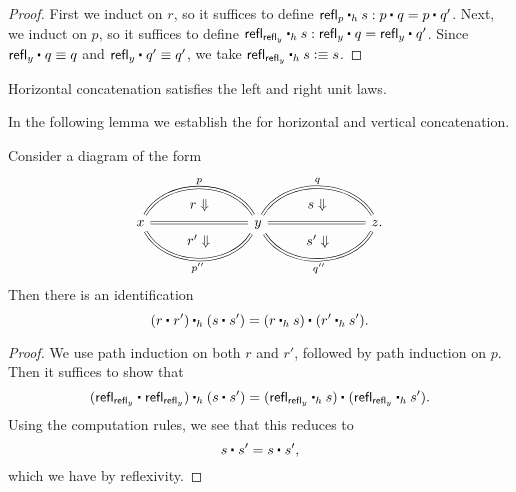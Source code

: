 \begin{proof}
First we induct on $r$, so it suffices to define $\ct[h]{\refl{p}}{s}:\ct{p}{q}=\ct{p}{q'}$. 
Next, we induct on $p$, so it suffices to define $\ct[h]{\refl{\refl{y}}}{s}:\ct{\refl{y}}{q}=\ct{\refl{y}}{q'}$. 
Since $\ct{\refl{y}}{q}\jdeq q$ and $\ct{\refl{y}}{q'}\jdeq q'$, we take $\ct[h]{\refl{\refl{y}}}{s}\defeq s$. 
\end{proof}

\begin{lem}
Horizontal concatenation satisfies the left and right unit laws.
\end{lem}

In the following lemma we establish the  for horizontal and vertical concatenation.

\begin{lem}
Consider a diagram of the form
\begin{equation*}
\begin{tikzcd}[column sep=7em]
x \arrow[r,equals,bend left=60,"p",""{name=A,below}] \arrow[r,equals,""{name=B},""{name=E,below}] \arrow[r,equals,bend right=60,"{p''}"{below},""{name=F,above}] \arrow[from=A,to=B,phantom,"r\Downarrow"] \arrow[from=E,to=F,phantom,"{r'\Downarrow}"] 
& y \arrow[r,equals,bend left=60,"q",""{name=C,below}] \arrow[r,equals,""{name=G,above},""{name=H,below}] \arrow[r,equals,bend right=60,""{name=D,above},"{q''}"{below}] \arrow[from=C,to=G,phantom,"s\Downarrow"] \arrow[from=H,to=D,phantom,"{s'\Downarrow}"] & z.
\end{tikzcd}
\end{equation*}
Then there is an identification
\begin{equation*}
\ct[h]{(\ct{r}{r'})}{(\ct{s}{s'})}=\ct{(\ct[h]{r}{s})}{(\ct[h]{r'}{s'})}.
\end{equation*}
\end{lem}

\begin{proof}
We use path induction on both $r$ and $r'$, followed by path induction on $p$. Then it suffices to show that
\begin{equation*}
\ct[h]{(\ct{\refl{\refl{y}}}{\refl{\refl{y}}})}{(\ct{s}{s'})}=\ct{(\ct[h]{\refl{\refl{y}}}{s})}{(\ct[h]{\refl{\refl{y}}}{s'})}.
\end{equation*}
Using the computation rules, we see that this reduces to
\begin{equation*}
\ct{s}{s'}=\ct{s}{s'},
\end{equation*}
which we have by reflexivity.
\end{proof}

